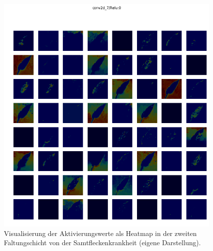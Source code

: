 \begin{figure}[h!]
	\centering
	\includegraphics[width=\textwidth]{visualisierungen/leaf_mold/heatmap_mit/conv2d_7.png}
	\caption{Visualisierung der Aktivierungswerte als Heatmap in der zweiten Faltungschicht von der Samtfleckenkrankheit (eigene Darstellung).}
	\label{}
\end{figure}

